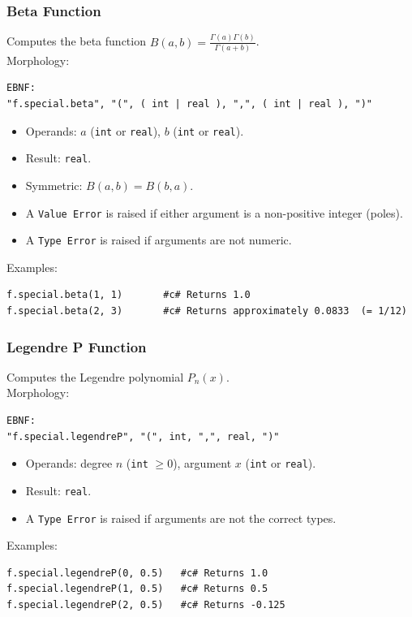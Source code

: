 \subsubsection{Beta Function}
Computes the beta function $B(a,b) = \frac{\Gamma(a)\Gamma(b)}{\Gamma(a+b)}$. \\
Morphology:
\begin{verbatim}
EBNF:
"f.special.beta", "(", ( int | real ), ",", ( int | real ), ")"
\end{verbatim}
\begin{itemize}
\item Operands: $a$ (\texttt{int} or \texttt{real}), $b$ (\texttt{int} or \texttt{real}).
\item Result: \texttt{real}.
\item Symmetric: $B(a, b) = B(b, a)$.
\item A \texttt{Value Error} is raised if either argument is a non-positive integer (poles).
\item A \texttt{Type Error} is raised if arguments are not numeric.
\end{itemize}
Examples:
\begin{verbatim}
f.special.beta(1, 1)       #c# Returns 1.0
f.special.beta(2, 3)       #c# Returns approximately 0.0833  (= 1/12)
\end{verbatim}

\subsubsection{Legendre P Function}
Computes the Legendre polynomial $P_n(x)$. \\
Morphology:
\begin{verbatim}
EBNF:
"f.special.legendreP", "(", int, ",", real, ")"
\end{verbatim}
\begin{itemize}
\item Operands: degree $n$ (\texttt{int} $\geq 0$), argument $x$ (\texttt{int} or \texttt{real}).
\item Result: \texttt{real}.
\item A \texttt{Type Error} is raised if arguments are not the correct types.
\end{itemize}
Examples:
\begin{verbatim}
f.special.legendreP(0, 0.5)   #c# Returns 1.0
f.special.legendreP(1, 0.5)   #c# Returns 0.5
f.special.legendreP(2, 0.5)   #c# Returns -0.125
\end{verbatim}

